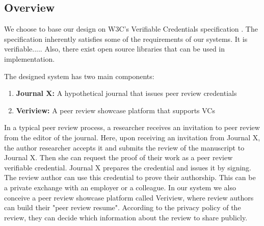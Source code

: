 





\subsection{Overview}

We choose to base our design on W3C's Verifiable Credentials specification \parencite{Sporny.18Kas2019}. The specification inherently satisfies some of the requirements of our systems. It is verifiable..... Also, there exist open source libraries that can be used in implementation.

The designed system has two main components:

\begin{enumerate}
    \item \textbf{Journal X:} A hypothetical journal that issues peer review credentials
    \item \textbf{Veriview:} A peer review showcase platform that supports VCs
\end{enumerate}

In a typical peer review process, a researcher receives an invitation to peer review from the editor of the journal. Here, upon receiving an invitation from Journal X, the author researcher accepts it and submits the review of the manuscript to Journal X. Then she can request the proof of their work as a peer review verifiable credential. Journal X prepares the credential and issues it by signing. The review author can use this credential to prove their authorship. This can be a private exchange with an employer or a colleague. In our system we also conceive a peer review showcase platform called Veriview, where review authors can build their "peer review resume". According to the privacy policy of the review, they can decide which information about the review to share publicly.

